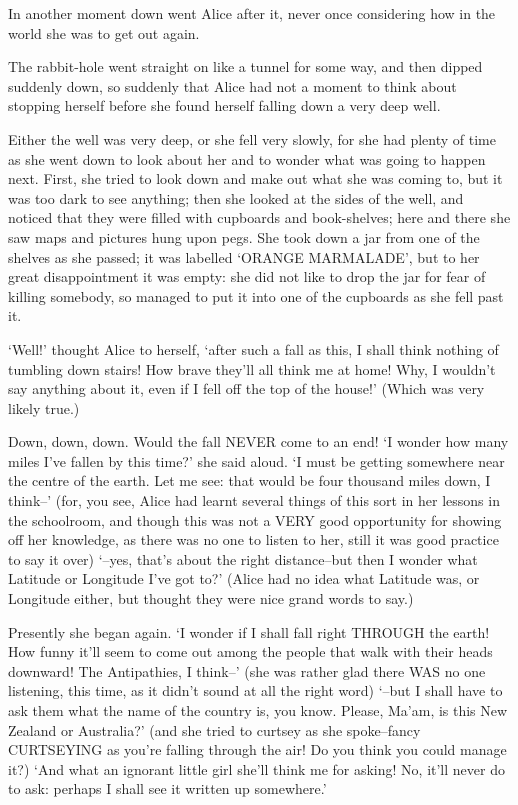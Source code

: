 \documentclass[12pt]{book}
\begin{document}
  In another moment down went Alice after it, never once
considering how in the world she was to get out again.

  The rabbit-hole went straight on like a tunnel for some way,
and then dipped suddenly down, so suddenly that Alice had not a
moment to think about stopping herself before she found herself
falling down a very deep well.

  Either the well was very deep, or she fell very slowly, for she
had plenty of time as she went down to look about her and to
wonder what was going to happen next.  First, she tried to look
down and make out what she was coming to, but it was too dark to
see anything; then she looked at the sides of the well, and
noticed that they were filled with cupboards and book-shelves;
here and there she saw maps and pictures hung upon pegs.  She
took down a jar from one of the shelves as she passed; it was
labelled `ORANGE MARMALADE', but to her great disappointment it
was empty:  she did not like to drop the jar for fear of killing
somebody, so managed to put it into one of the cupboards as she
fell past it.

  `Well!' thought Alice to herself, `after such a fall as this, I
shall think nothing of tumbling down stairs!  How brave they'll
all think me at home!  Why, I wouldn't say anything about it,
even if I fell off the top of the house!' (Which was very likely
true.)

  Down, down, down.  Would the fall NEVER come to an end!  `I
wonder how many miles I've fallen by this time?' she said aloud.
`I must be getting somewhere near the centre of the earth.  Let
me see:  that would be four thousand miles down, I think--' (for,
you see, Alice had learnt several things of this sort in her
lessons in the schoolroom, and though this was not a VERY good
opportunity for showing off her knowledge, as there was no one to
listen to her, still it was good practice to say it over) `--yes,
that's about the right distance--but then I wonder what Latitude
or Longitude I've got to?'  (Alice had no idea what Latitude was,
or Longitude either, but thought they were nice grand words to
say.)

  Presently she began again.  `I wonder if I shall fall right
THROUGH the earth!  How funny it'll seem to come out among the
people that walk with their heads downward!  The Antipathies, I
think--' (she was rather glad there WAS no one listening, this
time, as it didn't sound at all the right word) `--but I shall
have to ask them what the name of the country is, you know.
Please, Ma'am, is this New Zealand or Australia?' (and she tried
to curtsey as she spoke--fancy CURTSEYING as you're falling
through the air!  Do you think you could manage it?)  `And what
an ignorant little girl she'll think me for asking!  No, it'll
never do to ask:  perhaps I shall see it written up somewhere.'
\end{document}
